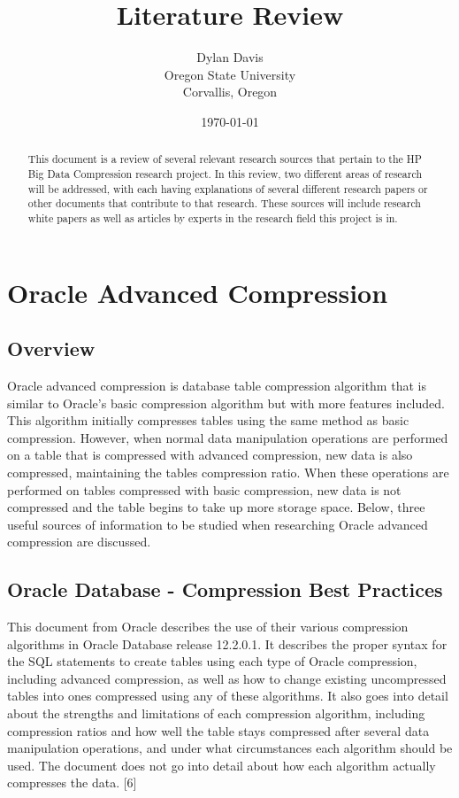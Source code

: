 \documentclass[10pt]{article}
\title{Literature Review}
\author{
	Dylan Davis \\
	Oregon State University\\
	Corvallis, Oregon
}
\date{\today}
\begin{document}
\begin{titlingpage}
\maketitle

\begin{abstract}

This document is a review of several relevant research sources that pertain to the HP Big Data Compression research project. 
In this review, two different areas of research will be addressed, with each having explanations of several different research papers or other documents that contribute to that research.
These sources will include research white papers as well as articles by experts in the research field this project is in. 

\end{abstract}
\end{titlingpage}


\clearpage


\section{Oracle Advanced Compression}
\subsection{Overview}

Oracle advanced compression is database table compression algorithm that is similar to Oracle's basic compression algorithm but with more features included. 
This algorithm initially compresses tables using the same method as basic compression. 
However, when normal data manipulation operations are performed on a table that is compressed with advanced compression, new data is also compressed, maintaining the tables compression ratio.
When these operations are performed on tables compressed with basic compression, new data is not compressed and the table begins to take up more storage space.
Below, three useful sources of information to be studied when researching Oracle advanced compression are discussed. 

\subsection{Oracle Database - Compression Best Practices}

This document from Oracle describes the use of their various compression algorithms in Oracle Database release 12.2.0.1.
It describes the proper syntax for the SQL statements to create tables using each type of Oracle compression, including advanced compression, as well as how to change existing uncompressed tables into ones compressed using any of these algorithms.
It also goes into detail about the strengths and limitations of each compression algorithm, including compression ratios and how well the table stays compressed after several data manipulation operations, and under what circumstances each algorithm should be used. 
The document does not go into detail about how each algorithm actually compresses the data. [6]
\end{document}
